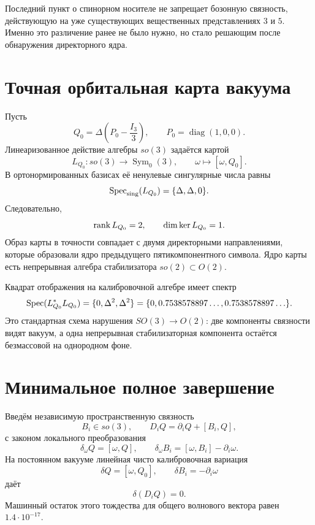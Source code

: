 Последний пункт о спинорном носителе не запрещает бозонную связность,
действующую на уже существующих вещественных представлениях $3$ и $5$.
Именно это различение ранее не было нужно, но стало решающим после
обнаружения директорного ядра.

\section{Точная орбитальная карта вакуума}

Пусть
\begin{equation}
 Q_0=\Delta\left(P_0-\frac{I_3}{3}\right),
 \qquad P_0=\operatorname{diag}(1,0,0).
\end{equation}
Линеаризованное действие алгебры $so(3)$ задаётся картой
\begin{equation}
 L_{Q_0}:so(3)\longrightarrow\operatorname{Sym}_0(3),
 \qquad \omega\longmapsto[\omega,Q_0].
 \label{eq:v6-full-gauge-orbit-map}
\end{equation}
В ортонормированных базисах её ненулевые сингулярные числа равны
\begin{equation}
 \operatorname{Spec}_{\rm sing}(L_{Q_0})=\{\Delta,\Delta,0\}.
\end{equation}
Следовательно,
\begin{equation}
 \operatorname{rank} L_{Q_0}=2,
 \qquad \dim\ker L_{Q_0}=1.
\end{equation}
Образ карты в точности совпадает с двумя директорными направлениями,
которые образовали ядро предыдущего пятикомпонентного символа. Ядро карты
есть непрерывная алгебра стабилизатора $so(2)\subset O(2)$.

Квадрат отображения на калибровочной алгебре имеет спектр
\begin{equation}
 \operatorname{Spec}(L_{Q_0}^{*}L_{Q_0})
 =\{0,\Delta^2,\Delta^2\}
 =\{0,0.7538578897\ldots,0.7538578897\ldots\}.
 \label{eq:v6-full-gauge-mass-map}
\end{equation}
Это стандартная схема нарушения $SO(3)\to O(2)$: две компоненты связности
видят вакуум, а одна непрерывная стабилизаторная компонента остаётся
безмассовой на однородном фоне.

\section{Минимальное полное завершение}

Введём независимую пространственную связность
\begin{equation}
 B_i\in so(3),
 \qquad
 D_iQ=\partial_iQ+[B_i,Q],
\end{equation}
с законом локального преобразования
\begin{equation}
 \delta_\omega Q=[\omega,Q],
 \qquad
 \delta_\omega B_i=[\omega,B_i]-\partial_i\omega.
 \label{eq:v6-full-gauge-law}
\end{equation}
На постоянном вакууме линейная чисто калибровочная вариация
\begin{equation}
 \delta Q=[\omega,Q_0],
 \qquad
 \delta B_i=-\partial_i\omega
\end{equation}
даёт
\begin{equation}
 \delta(D_iQ)=0.
\end{equation}
Машинный остаток этого тождества для общего волнового вектора равен
$1.4\cdot10^{-17}$.

